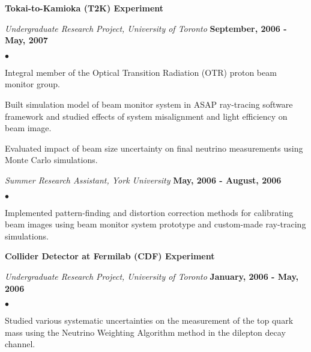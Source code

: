 \documentclass[margin,line]{res}
\newenvironment{list2}{
  \begin{list}{$\bullet$}{%
      \setlength{\itemsep}{0in}
      \setlength{\parsep}{0in} \setlength{\parskip}{0in}
      \setlength{\topsep}{0in} \setlength{\partopsep}{0in} 
      \setlength{\leftmargin}{0.2in}}}{\end{list}}
\begin{document}
\begin{resume}
{\bf Tokai-to-Kamioka (T2K) Experiment}

\vspace{-.3cm}
{\em Undergraduate Research Project, University of Toronto} \hfill {\bf September, 2006 - May, 2007}\\
\vspace*{-2mm}
\begin{list2}
\item Integral member of the Optical Transition Radiation (OTR) proton beam monitor group.
\item Built simulation model of beam monitor system in
  ASAP\textsuperscript{\texttrademark} ray-tracing software framework
  and studied effects of system misalignment and light efficiency on
  beam image.
\item Evaluated impact of beam size uncertainty on final neutrino
  measurements using Monte Carlo simulations.
\end{list2}

{\em Summer Research Assistant, York University} \hfill {\bf May, 2006
  - August, 2006}\\
\vspace*{-2mm}
\begin{list2}
\item Implemented pattern-finding and distortion correction methods
  for calibrating beam images using beam monitor system prototype and
  custom-made ray-tracing simulations.
\end{list2}


{\bf Collider Detector at Fermilab (CDF) Experiment}

\vspace{-.3cm}
{\em Undergraduate Research Project, University of Toronto} \hfill {\bf January, 2006 - May, 2006}\\
\vspace*{-2mm}
\begin{list2}
\item Studied various systematic uncertainties on the measurement of
  the top quark mass using the Neutrino Weighting Algorithm method in
  the dilepton decay channel.
\end{list2}


\end{resume}
\end{document}
